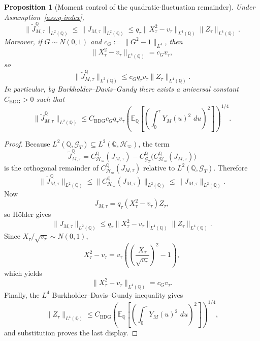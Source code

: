 \documentclass[11pt,a4paper]{amsart}
\theoremstyle{plain}
\newtheorem{proposition}[theorem]{Proposition}
\theoremstyle{definition}
\theoremstyle{remark}
\newcommand{\QQ}{\mathbb{Q}}
\newcommand{\EE}{\mathbb{E}}
\newcommand{\cG}{\mathcal{G}}
\newcommand{\cH}{\mathcal{H}}
\newcommand{\dd}{\,d}
\begin{document}
\begin{proposition}[Moment control of the quadratic-fluctuation remainder]\label{prop:gaussian-J-bound}
Under Assumption~\ref{ass:q-index},
\[
        \|\widetilde J_{M,\tau}^\QQ\|_{L^2(\QQ)}
        \le
        \|J_{M,\tau}\|_{L^2(\QQ)}
        \le
        q_\tau\|X_\tau^2-v_\tau\|_{L^4(\QQ)}\|Z_\tau\|_{L^4(\QQ)}.
\]
Moreover, if \(G\sim N(0,1)\) and \(c_G:=\|G^2-1\|_{L^4}\), then
\[
        \|X_\tau^2-v_\tau\|_{L^4(\QQ)}=c_G v_\tau,
\]
so
\[
        \|\widetilde J_{M,\tau}^\QQ\|_{L^2(\QQ)}
        \le
        c_G q_\tau v_\tau \|Z_\tau\|_{L^4(\QQ)}.
\]
In particular, by Burkholder--Davis--Gundy there exists a universal constant \(C_{\mathrm{BDG}}>0\)
such that
\[
        \|\widetilde J_{M,\tau}^\QQ\|_{L^2(\QQ)}
        \le
        C_{\mathrm{BDG}} c_G q_\tau v_\tau
        \left(
                \EE_\QQ\!\left[
                        \left(
                                \int_0^\tau Y_M(u)^2\,\dd u
                        \right)^2
                \right]
        \right)^{1/4}.
\]
\end{proposition}

\begin{proof}
Because \(L^2(\QQ,\cG_T)\subseteq L^2(\QQ,\cH_\varpi)\), the term
\[
        \widetilde J_{M,\tau}^\QQ
        =
        C_{\cH_\varpi}^\QQ(J_{M,\tau})
        -
        C_{\cG_T}^\QQ\bigl(C_{\cH_\varpi}^\QQ(J_{M,\tau})\bigr)
\]
is the orthogonal remainder of \(C_{\cH_\varpi}^\QQ(J_{M,\tau})\) relative to
\(L^2(\QQ,\cG_T)\).  Therefore
\[
        \|\widetilde J_{M,\tau}^\QQ\|_{L^2(\QQ)}
        \le
        \|C_{\cH_\varpi}^\QQ(J_{M,\tau})\|_{L^2(\QQ)}
        \le
        \|J_{M,\tau}\|_{L^2(\QQ)}.
\]
Now
\[
        J_{M,\tau}=q_\tau(X_\tau^2-v_\tau)Z_\tau,
\]
so H\"older gives
\[
        \|J_{M,\tau}\|_{L^2(\QQ)}
        \le
        q_\tau\|X_\tau^2-v_\tau\|_{L^4(\QQ)}\|Z_\tau\|_{L^4(\QQ)}.
\]
Since \(X_\tau/\sqrt{v_\tau}\sim N(0,1)\),
\[
        X_\tau^2-v_\tau
        =
        v_\tau\left(\left(\frac{X_\tau}{\sqrt{v_\tau}}\right)^2-1\right),
\]
which yields
\[
        \|X_\tau^2-v_\tau\|_{L^4(\QQ)}=c_G v_\tau.
\]
Finally, the \(L^4\) Burkholder--Davis--Gundy inequality gives
\[
        \|Z_\tau\|_{L^4(\QQ)}
        \le
        C_{\mathrm{BDG}}
        \left(
                \EE_\QQ\!\left[
                        \left(
                                \int_0^\tau Y_M(u)^2\,\dd u
                        \right)^2
                \right]
        \right)^{1/4},
\]
and substitution proves the last display.
\end{proof}
\end{document}
